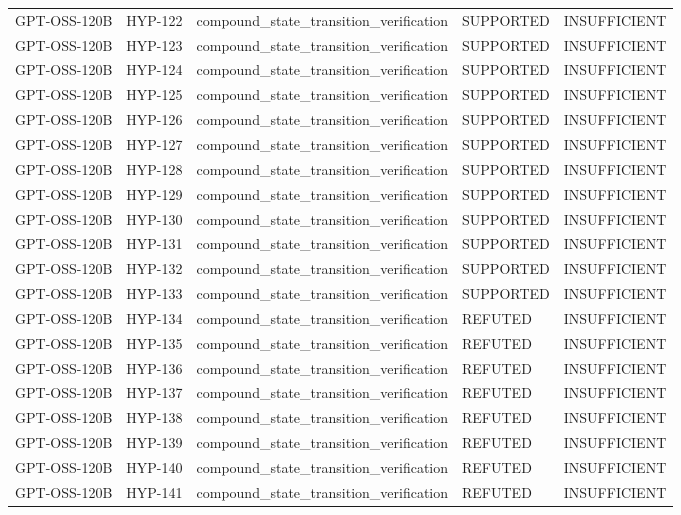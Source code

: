 \begin{tabular}{lllll}
GPT-OSS-120B & HYP-122 & compound_state_transition_verification & SUPPORTED & INSUFFICIENT \\
GPT-OSS-120B & HYP-123 & compound_state_transition_verification & SUPPORTED & INSUFFICIENT \\
GPT-OSS-120B & HYP-124 & compound_state_transition_verification & SUPPORTED & INSUFFICIENT \\
GPT-OSS-120B & HYP-125 & compound_state_transition_verification & SUPPORTED & INSUFFICIENT \\
GPT-OSS-120B & HYP-126 & compound_state_transition_verification & SUPPORTED & INSUFFICIENT \\
GPT-OSS-120B & HYP-127 & compound_state_transition_verification & SUPPORTED & INSUFFICIENT \\
GPT-OSS-120B & HYP-128 & compound_state_transition_verification & SUPPORTED & INSUFFICIENT \\
GPT-OSS-120B & HYP-129 & compound_state_transition_verification & SUPPORTED & INSUFFICIENT \\
GPT-OSS-120B & HYP-130 & compound_state_transition_verification & SUPPORTED & INSUFFICIENT \\
GPT-OSS-120B & HYP-131 & compound_state_transition_verification & SUPPORTED & INSUFFICIENT \\
GPT-OSS-120B & HYP-132 & compound_state_transition_verification & SUPPORTED & INSUFFICIENT \\
GPT-OSS-120B & HYP-133 & compound_state_transition_verification & SUPPORTED & INSUFFICIENT \\
GPT-OSS-120B & HYP-134 & compound_state_transition_verification & REFUTED & INSUFFICIENT \\
GPT-OSS-120B & HYP-135 & compound_state_transition_verification & REFUTED & INSUFFICIENT \\
GPT-OSS-120B & HYP-136 & compound_state_transition_verification & REFUTED & INSUFFICIENT \\
GPT-OSS-120B & HYP-137 & compound_state_transition_verification & REFUTED & INSUFFICIENT \\
GPT-OSS-120B & HYP-138 & compound_state_transition_verification & REFUTED & INSUFFICIENT \\
GPT-OSS-120B & HYP-139 & compound_state_transition_verification & REFUTED & INSUFFICIENT \\
GPT-OSS-120B & HYP-140 & compound_state_transition_verification & REFUTED & INSUFFICIENT \\
GPT-OSS-120B & HYP-141 & compound_state_transition_verification & REFUTED & INSUFFICIENT \\

\end{tabular}
